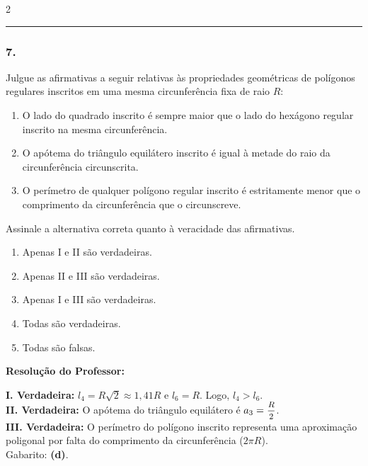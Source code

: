 \begin{multicols*}{2}
\par\vspace{\espacoQuestao}

\noindent\textcolor{CorLinha}{\rule{\linewidth}{0.5pt}} 
\par\vspace{\espacoPreQuestao}

\subsubsection*{7.} Julgue as afirmativas a seguir relativas às propriedades geométricas de polígonos regulares inscritos em uma mesma circunferência fixa de raio $R$:

\begin{enumerate}[label=\Roman*.]
    \item O lado do quadrado inscrito é sempre maior que o lado do hexágono regular inscrito na mesma circunferência.
    \item O apótema do triângulo equilátero inscrito é igual à metade do raio da circunferência circunscrita.
    \item O perímetro de qualquer polígono regular inscrito é estritamente menor que o comprimento da circunferência que o circunscreve.
\end{enumerate}

Assinale a alternativa correta quanto à veracidade das afirmativas.

\begin{enumerate}[label=\alph*)]
    \item Apenas I e II são verdadeiras.
    \item Apenas II e III são verdadeiras.
    \item Apenas I e III são verdadeiras.
    \item Todas são verdadeiras.
    \item Todas são falsas.
\end{enumerate}

\ifgabarito
    \begin{tcolorbox}[colback=CorTitUm!5, colframe=CorTitUm, boxrule=1pt, arc=4pt, left=6pt, right=6pt, top=6pt, bottom=6pt]
    \small\textbf{\textcolor{CorTitUm}{Resolução do Professor:}}\par\vspace{0.1cm}
    \color{CinzaEscuro}
    \textbf{I. Verdadeira:} $l_4 = R\sqrt{2} \approx 1,41R$ e $l_6 = R$. Logo, $l_4 > l_6$.
    \\[0.1cm]
    \textbf{II. Verdadeira:} O apótema do triângulo equilátero é $a_3 = \mfrac{R}{2}$.
    \\[0.1cm]
    \textbf{III. Verdadeira:} O perímetro do polígono inscrito representa uma aproximação poligonal por falta do comprimento da circunferência ($2\pi R$).
    \\[0.1cm]
    Gabarito: \textbf{(d)}.
    \end{tcolorbox}
    

\end{multicols*}
